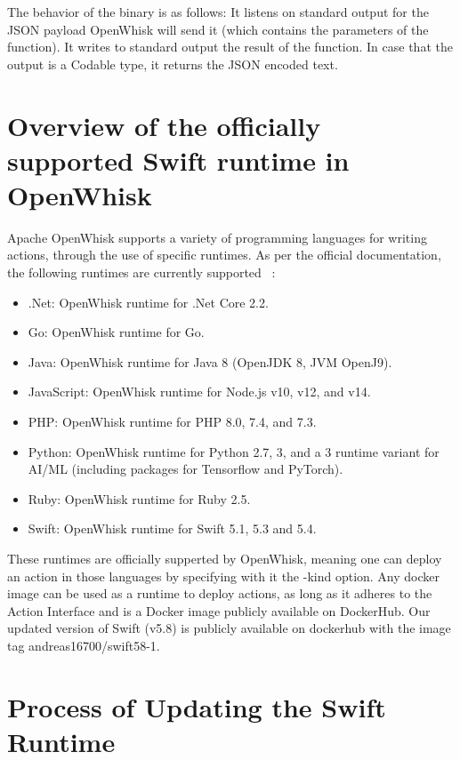 The behavior of the binary is as follows: It listens on standard output for the JSON payload OpenWhisk will send it (which contains the parameters of the function). It writes to standard output the result of the function. In case that the output is a Codable type, it returns the JSON encoded text.

\section{Overview of the officially supported Swift runtime in OpenWhisk}
Apache OpenWhisk supports a variety of programming languages for writing actions, through the use of specific runtimes. As per the official documentation, the following runtimes are currently supported 
~\cite{openwhisk2023}:

\begin{itemize}
\item .Net: OpenWhisk runtime for .Net Core 2.2.
\item Go: OpenWhisk runtime for Go.
\item Java: OpenWhisk runtime for Java 8 (OpenJDK 8, JVM OpenJ9).
\item JavaScript: OpenWhisk runtime for Node.js v10, v12, and v14.
\item PHP: OpenWhisk runtime for PHP 8.0, 7.4, and 7.3.
\item Python: OpenWhisk runtime for Python 2.7, 3, and a 3 runtime variant for AI/ML (including packages for Tensorflow and PyTorch).
\item Ruby: OpenWhisk runtime for Ruby 2.5.
\item Swift: OpenWhisk runtime for Swift 5.1, 5.3 and 5.4.
\end{itemize}

These runtimes are officially supperted by OpenWhisk, meaning one can deploy an action in those languages by specifying with it the -kind option.
Any docker image can be used as a runtime to deploy actions, as long as it adheres to the Action Interface and is a Docker image publicly available on DockerHub. Our updated version of Swift (v5.8) is publicly available on dockerhub with the image tag andreas16700/swift58-1.
\section{Process of Updating the Swift Runtime}
\label{sec:UpdatingProcess}

